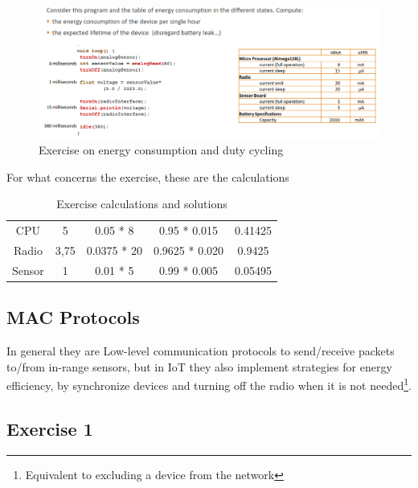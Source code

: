\begin{figure}[htbp]
   \centering
   \includegraphics{images/energy_exercise.png}
   \caption{Exercise on energy consumption and duty cycling}
   \label{fig:energy_exercise}
\end{figure}
For what concerns the exercise, these are the calculations
\begin{table}[htbp]
   \centering
   \begin{tabular}{|c|c|c|c|c|}
      CPU & 5 &				0.05 * 8 	& 0.95 * 0.015	&	 0.41425\\
      Radio & 3,75 &		0.0375 * 20 	& 0.9625 * 0.020 &	 0.9425\\
      Sensor & 1 &			0.01 * 5		& 	0.99 * 0.005	&	 0.05495\\
   \end{tabular}
   \caption{Exercise calculations and solutions}
   \label{tab:battery_consumption}
\end{table}

\subsection{MAC Protocols}
In general they are Low-level communication protocols to send/receive packets to/from in-range sensors, but in IoT  they also implement strategies for energy efficiency, by synchronize devices and turning off the radio when it is not needed\footnote{Equivalent to excluding a device from the network}.

\subsection*{Exercise 1}

